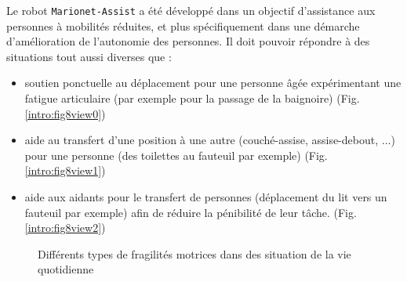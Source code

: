 Le robot {\tt Marionet-Assist} a été développé dans un objectif d'assistance 
aux personnes à mobilités réduites, et plus spécifiquement dans une démarche 
d'amélio\-ration de l'autonomie des personnes. Il doit pouvoir répondre 
à des situations tout aussi diverses que :
\begin{itemize}
 \item soutien ponctuelle au déplacement pour une personne âgée expérimentant 
une fatigue articulaire (par exemple pour la passage de la baignoire) 
(Fig.\ref{intro:fig8view0})
 \item aide au transfert d'une position à une autre (couché-assise, 
assise-debout, $\dots$) pour une personne (des toilettes au fauteuil par 
exemple) 
(Fig.\ref{intro:fig8view1})
 \item aide aux aidants pour le transfert de personnes (déplacement du lit vers 
un fauteuil par exemple) afin de r\'eduire la p\'enibilit\'e de leur t\^ache. 
(Fig.\ref{intro:fig8view2})
\end{itemize}

\begin{figure}[htp]
  \centering
   \hfill
   \hfill
   \hfill
    \caption{\footnotesize{Différents types de fragilités motrices dans des 
situation de la vie quotidienne}}
\label{intro:fig8}
\end{figure}

